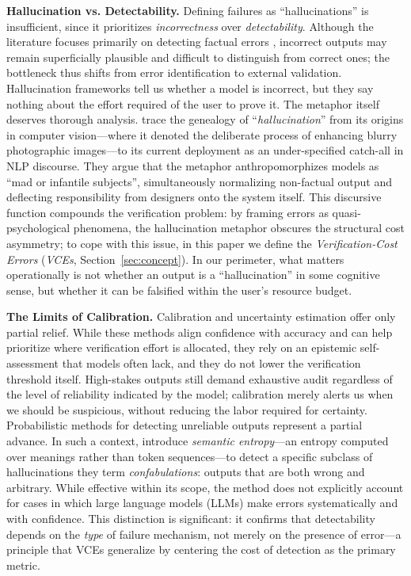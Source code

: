 \documentclass[11pt]{article}
\newcommand{\cfix}[1]{\textcolor{green!50!black}{#1}}
\newcommand{\cfix}[1]{#1}
\begin{document}
\textbf{Hallucination vs. Detectability.} Defining failures as ``hallucinations'' is insufficient, since it prioritizes \textit{incorrectness} over \textit{detectability}.
\cfix{Although the literature focuses primarily on detecting factual errors \citep{lin2022truthfulqa, li2023halueval, manakul2023selfcheckgpt}, incorrect outputs may remain superficially plausible and difficult to distinguish from correct ones; the bottleneck thus shifts from error identification to external validation.}
Hallucination frameworks tell us whether a model is incorrect, but they say nothing about {the effort required of the user to prove it.}
The metaphor itself deserves thorough analysis.  \cite{forster2025factfairy} \cfix{trace} the genealogy of ``\textit{hallucination}'' from its origins in computer vision—where it denoted the deliberate process of enhancing blurry photographic images—to its current deployment as an under-specified catch-all in NLP discourse.
They argue that the metaphor anthropomorphizes models as ``mad or infantile subjects'', simultaneously normalizing non-factual output and deflecting responsibility from designers onto the system itself.
This discursive function compounds the verification problem: by framing errors as quasi-psychological phenomena, the hallucination metaphor obscures the structural cost asymmetry; {to cope with this issue, in this paper we define the \emph{Verification-Cost Errors} (\emph{VCEs}, Section~\ref{sec:concept}). }
{In our perimeter, what matters operationally is not whether an output is a ``hallucination'' in some cognitive sense, but whether it can be falsified within the user's resource budget.}

\textbf{The Limits of Calibration.} {Calibration and uncertainty estimation offer only partial relief. While these methods align confidence with accuracy \citep{guo2017calibration, jiang2021calibration} and can help prioritize where verification effort is allocated, they rely on an epistemic self-assessment that models often lack, and they do not lower the verification threshold itself.} High-stakes outputs still demand exhaustive audit {regardless of the level of reliability indicated by the model;}
calibration merely {alerts us} when we should be suspicious, without reducing the labor required for certainty. Probabilistic methods for detecting unreliable outputs represent a partial advance.
{In such a context,} \cite{farquhar2024semanticentropy} \cfix{introduce} \textit{semantic entropy}---an entropy computed over meanings rather than token sequences---to detect a specific subclass of hallucinations they term \textit{confabulations}: outputs that are both wrong and arbitrary. While effective within its scope,
{the method does not explicitly account for cases in which large language models (LLMs) make errors systematically and with confidence.}
This distinction is significant: it confirms that detectability depends on the \textit{type} of failure mechanism, not merely on the presence of error---a principle that VCEs generalize by centering the cost of detection as the primary metric.
\end{document}
